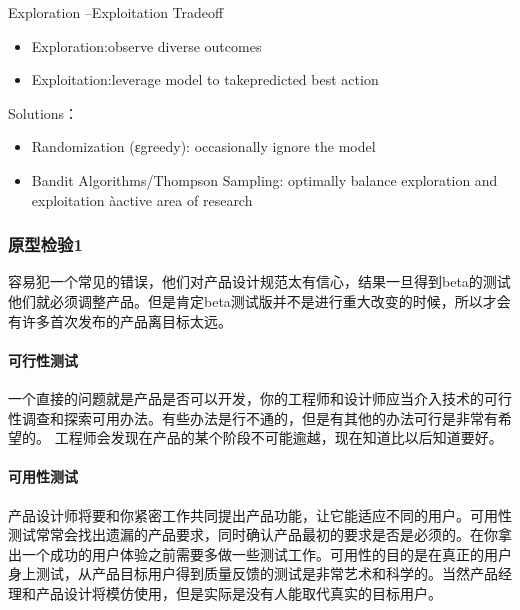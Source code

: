 \documentclass[letterpaper,11pt,english]{sphinxmanual}
\begin{document}
Exploration –Exploitation Trade\sphinxhyphen{}off
\begin{itemize}
\item {} 
Exploration:observe diverse outcomes

\item {} 
Exploitation:leverage model to takepredicted best action

\end{itemize}

Solutions：
\begin{itemize}
\item {} 
Randomization (ε\sphinxhyphen{}greedy): occasionally ignore the model

\item {} 
Bandit Algorithms/Thompson Sampling: optimally balance exploration
and exploitation àactive area of research

\end{itemize}


\subsubsection{原型检验1\sphinxfootnotemark[732]}
\label{\detokenize{chapter_project/inspect:id1}}\label{\detokenize{chapter_project/inspect::doc}}%
\begin{footnotetext}[732]\sphinxAtStartFootnote
{}
%
\end{footnotetext}\ignorespaces 
容易犯一个常见的错误，他们对产品设计规范太有信心，结果一旦得到beta的测试他们就必须调整产品。但是肯定beta测试版并不是进行重大改变的时候，所以才会有许多首次发布的产品离目标太远。


\paragraph{可行性测试}
\label{\detokenize{chapter_project/inspect:id2}}
一个直接的问题就是产品是否可以开发，你的工程师和设计师应当介入技术的可行性调查和探索可用办法。有些办法是行不通的，但是有其他的办法可行是非常有希望的。
工程师会发现在产品的某个阶段不可能逾越，现在知道比以后知道要好。


\paragraph{可用性测试}
\label{\detokenize{chapter_project/inspect:id3}}
产品设计师将要和你紧密工作共同提出产品功能，让它能适应不同的用户。可用性测试常常会找出遗漏的产品要求，同时确认产品最初的要求是否是必须的。在你拿出一个成功的用户体验之前需要多做一些测试工作。可用性的目的是在真正的用户身上测试，从产品目标用户得到质量反馈的测试是非常艺术和科学的。当然产品经理和产品设计将模仿使用，但是实际是没有人能取代真实的目标用户。
\end{document}
